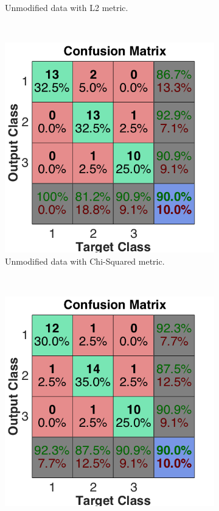 \documentclass[a4paper, 10pt, conference]{ieeeconf}
\begin{document}
\begin{figure}[!ht]
\begin{subfigure}{0.32\textwidth}
      \caption{Unmodified data with L2 metric.}
    \end{subfigure}
    ~
    \begin{subfigure}{0.32\textwidth}
      \includegraphics[width=\textwidth]{pic/unmod_chi.png}
      \caption{Unmodified data with Chi-Squared metric.}
    \end{subfigure}
    \\
    \begin{subfigure}{0.32\textwidth}
      \includegraphics[width=\textwidth]{pic/unmod_inter.png}

\end{subfigure}
\end{figure}
\end{document}

